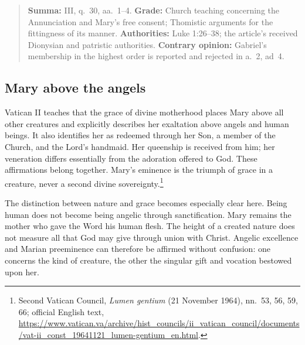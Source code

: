 \begin{quote}\small
\textbf{Summa:} III, q.~30, aa.~1--4.\quad
\textbf{Grade:} Church teaching concerning the Annunciation and Mary's free
consent; Thomistic arguments for the fittingness of its manner.\quad
\textbf{Authorities:} Luke 1:26--38; the article's received Dionysian and
patristic authorities.\quad
\textbf{Contrary opinion:} Gabriel's membership in the highest order is
reported and rejected in a.~2, ad~4.
\end{quote}

\subsection{Mary above the angels}

Vatican II teaches that the grace of divine motherhood places Mary above all
other creatures and explicitly describes her exaltation above angels and
human beings. It also identifies her as redeemed through her Son, a member
of the Church, and the Lord's handmaid. Her queenship is received from him;
her veneration differs essentially from the adoration offered to God.
These affirmations belong together. Mary's eminence is the triumph of grace
in a creature, never a second divine sovereignty.\footnote{Second Vatican
Council, \emph{Lumen gentium} (21 November 1964), nn.~53, 56, 59, 66;
official English text, \url{https://www.vatican.va/archive/hist_councils/ii_vatican_council/documents/vat-ii_const_19641121_lumen-gentium_en.html}.}

The distinction between nature and grace becomes especially clear here.
Being human does not become being angelic through sanctification. Mary
remains the mother who gave the Word his human flesh. The height of a created
nature does not measure all that God may give through union with Christ.
Angelic excellence and Marian preeminence can therefore be affirmed without
confusion: one concerns the kind of creature, the other the singular gift and
vocation bestowed upon her.
